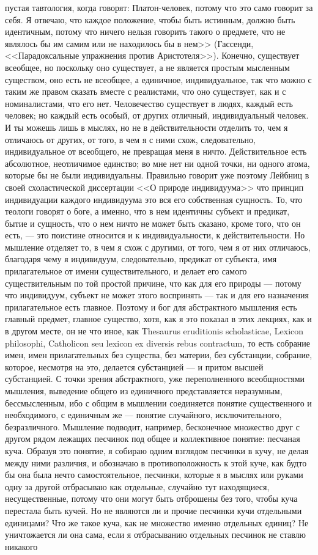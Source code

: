 \documentclass[12pt]{article}
\begin{document}
пустая тавтология, когда говорят: Платон-человек, потому что это само говорит за себя. Я отвечаю, что каждое положение, чтобы быть истинным, должно быть идентичным, потому что ничего нельзя говорить такого о предмете, что не являлось бы им самим или не находилось бы в нем>> (Гассенди, <<Парадоксальные упражнения против Аристотеля>>). Конечно, существует всеобщее, но поскольку оно существует, а не является простым мысленным существом, оно есть не всеобщее, а единичное, индивидуальное, так что можно с таким же правом сказать вместе с реалистами, что оно существует, как и с номиналистами, что его нет. Человечество существует в людях, каждый есть человек; но каждый есть особый, от других отличный, индивидуальный человек. И ты можешь лишь в мыслях, но не в действительности отделить то, чем я отличаюсь от других, от того, в чем я с ними схож, следовательно, индивидуальное от всеобщего, не превращая меня в ничто. Действительное есть абсолютное, неотличимое единство; во мне нет ни одной точки, ни одного атома, которые бы не были индивидуальны. Правильно говорит уже поэтому Лейбниц в своей схоластической диссертации <<О природе индивидуума>>  что принцип индивидуации каждого индивидуума это вся его собственная сущность. То, что теологи говорят о боге, а именно, что в нем идентичны субъект и предикат, бытие и сущность, что о нем ничто не может быть сказано, кроме того, что он есть, --- это поистине относится и к индивидуальности, к действительности. Но мышление отделяет то, в чем я схож с другими, от того, чем я от них отличаюсь, благодаря чему я индивидуум, следовательно, предикат от субъекта, имя прилагательное от имени существительного, и делает его самого существительным по той простой причине, что как для его природы --- потому что индивидуум, субъект не может этого воспринять --- так и для его назначения прилагательное есть главное. Поэтому и бог для абстрактного мышления есть главный предмет, главное существо, хотя, как я это показал в этих лекциях, как и в другом месте, он не что иное, как Thesaurus eruditionis scholasticae, Lexicon philosophi, Catholicon seu lexicon ex diversis rebus contractum, то есть собрание имен, имен прилагательных без существа, без материи, без субстанции, собрание, которое, несмотря на это, делается субстанцией --- и притом высшей субстанцией. С точки зрения абстрактного, уже переполненного всеобщностями мышления, выведение общего из единичного представляется неразумным, бессмысленным, ибо с общим в мышлении соединяется понятие существенного и необходимого, с единичным же --- понятие случайного, исключительного, безразличного. Мышление подводит, например, бесконечное множество друг с другом рядом лежащих песчинок под общее и коллективное понятие: песчаная куча. Образуя это понятие, я собираю одним взглядом песчинки в кучу, не делая между ними различия, и обозначаю в противоположность к этой куче, как будто бы она была нечто самостоятельное, песчинки, которые я в мыслях или руками одну за другой отбрасываю как отдельные, случайно тут находящиеся, несущественные, потому что они могут быть отброшены без того, чтобы куча перестала быть кучей. Но не являются ли и прочие песчинки кучи отдельными единицами? Что же такое куча, как не множество именно отдельных единиц? Не уничтожается ли она сама, если я отбрасыванию отдельных песчинок не ставлю никакого 
\end{document}
